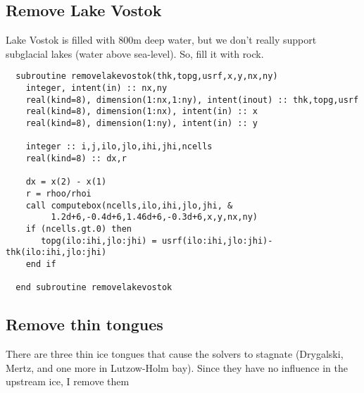 \documentclass{article}
\begin{document}
\subsection{\label{sec::rlv} Remove Lake Vostok}

Lake Vostok is filled with 800m deep water, but we don't really support subglacial
lakes (water above sea-level). So, fill it with rock.


\begin{lstlisting}
  subroutine removelakevostok(thk,topg,usrf,x,y,nx,ny)
    integer, intent(in) :: nx,ny
    real(kind=8), dimension(1:nx,1:ny), intent(inout) :: thk,topg,usrf
    real(kind=8), dimension(1:nx), intent(in) :: x
    real(kind=8), dimension(1:ny), intent(in) :: y

    integer :: i,j,ilo,jlo,ihi,jhi,ncells
    real(kind=8) :: dx,r

    dx = x(2) - x(1)
    r = rhoo/rhoi
    call computebox(ncells,ilo,ihi,jlo,jhi, & 
         1.2d+6,-0.4d+6,1.46d+6,-0.3d+6,x,y,nx,ny)
    if (ncells.gt.0) then
       topg(ilo:ihi,jlo:jhi) = usrf(ilo:ihi,jlo:jhi)-thk(ilo:ihi,jlo:jhi)
    end if

  end subroutine removelakevostok
\end{lstlisting}


\subsection{\label{sec::rtt} Remove thin tongues}
There are three thin ice tongues that cause the solvers to stagnate (Drygalski, Mertz, and one 
more in Lutzow-Holm bay). Since they have no influence in the upstream ice, I remove them
\end{document}
